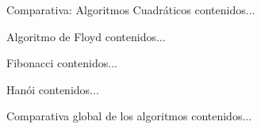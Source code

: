 \documentclass[10pt,compress,usetitleprogressbar,mathserif]{beamer}
\begin{document}
\begin{frame}{\small{Comparativa: Algoritmos Cuadráticos}}
	contenidos...
\end{frame}

\begin{frame}{Algoritmo de Floyd}
	contenidos...
\end{frame}

\begin{frame}{Fibonacci}
	contenidos...
\end{frame}

\begin{frame}{Hanói}
	contenidos...
\end{frame}

\begin{frame}{\small{Comparativa global de los algoritmos}}
	contenidos...
\end{frame}
\end{document}
